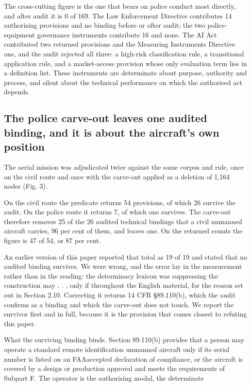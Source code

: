 The cross-cutting figure is the one that bears on police conduct most directly, and after audit it is 0 of 169. The Law Enforcement Directive contributes 14 authorising provisions and no binding before or after audit; the two police-equipment governance instruments contribute 16 and none. The AI Act contributed two returned provisions and the Measuring Instruments Directive one, and the audit rejected all three: a high-risk classification rule, a transitional application rule, and a market-access provision whose only evaluation term lies in a definition list. These instruments are determinate about purpose, authority and process, and silent about the technical performance on which the authorised act depends.

\subsection{The police carve-out leaves one audited binding, and it is about the aircraft's own position}\label{sec:3.4}

The aerial mission was adjudicated twice against the same corpus and rule, once on the civil route and once with the carve-out applied as a deletion of 1,164 nodes (Fig. 3).

On the civil route the predicate returns 54 provisions, of which 26 survive the audit. On the police route it returns 7, of which one survives. The carve-out therefore removes 25 of the 26 audited technical bindings that a civil unmanned aircraft carries, 96 per cent of them, and leaves one. On the returned counts the figure is 47 of 54, or 87 per cent.

An earlier version of this paper reported that total as 19 of 19 and stated that no audited binding survives. We were wrong, and the error lay in the measurement rather than in the reading: the determinacy lexicon was suppressing the construction may . . . only if throughout the English material, for the reason set out in Section 2.10. Correcting it returns 14 CFR \S{}89.110(b), which the audit confirms as a binding and which the carve-out does not touch. We report the survivor first and in full, because it is the provision that comes closest to refuting this paper.

What the surviving binding binds. Section 89.110(b) provides that a person may operate a standard remote identification unmanned aircraft only if its serial number is listed on an FAAaccepted declaration of compliance, or the aircraft is covered by a design or production approval and meets the requirements of Subpart F. The operator is the authorising modal, the determinate

